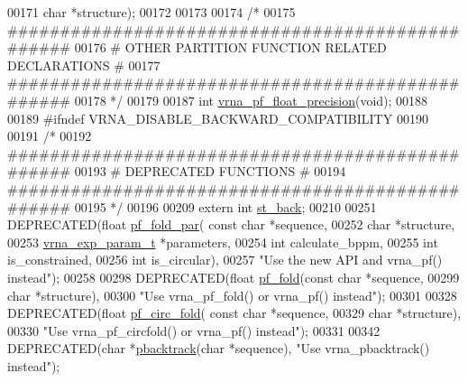 \begin{DoxyCode}
00171               \textcolor{keywordtype}{char}                  *structure);
00172 
00173 
00174 \textcolor{comment}{/*}
00175 \textcolor{comment}{#################################################}
00176 \textcolor{comment}{# OTHER PARTITION FUNCTION RELATED DECLARATIONS #}
00177 \textcolor{comment}{#################################################}
00178 \textcolor{comment}{*/}
00179 
00187 \textcolor{keywordtype}{int} \hyperlink{part__func_8h_ad2b3594f0b50b68029e0f54fdce59313}{vrna\_pf\_float\_precision}(\textcolor{keywordtype}{void});
00188 
00189 \textcolor{preprocessor}{#ifndef VRNA\_DISABLE\_BACKWARD\_COMPATIBILITY}
00190 
00191 \textcolor{comment}{/*}
00192 \textcolor{comment}{#################################################}
00193 \textcolor{comment}{# DEPRECATED FUNCTIONS                          #}
00194 \textcolor{comment}{#################################################}
00195 \textcolor{comment}{*/}
00196 
00209 \textcolor{keyword}{extern}  \textcolor{keywordtype}{int} \hyperlink{group__subopt__stochbt_gacd79b1a570e6ad9be24cb11fe8cae30a}{st\_back};
00210 
00251 DEPRECATED(\textcolor{keywordtype}{float}   \hyperlink{group__pf__fold_gac4f95bee734b2563a3d6e9932117ebdf}{pf\_fold\_par}(  \textcolor{keyword}{const} \textcolor{keywordtype}{char} *sequence,
00252                       \textcolor{keywordtype}{char} *structure,
00253                       \hyperlink{group__energy__parameters_structvrna__exp__param__s}{vrna\_exp\_param\_t} *parameters,
00254                       \textcolor{keywordtype}{int} calculate\_bppm,
00255                       \textcolor{keywordtype}{int} is\_constrained,
00256                       \textcolor{keywordtype}{int} is\_circular),
00257 \textcolor{stringliteral}{"Use the new API and vrna\_pf() instead"});
00258 
00298 DEPRECATED(\textcolor{keywordtype}{float}   \hyperlink{group__pf__fold_gadc3db3d98742427e7001a7fd36ef28c2}{pf\_fold}(\textcolor{keyword}{const} \textcolor{keywordtype}{char} *sequence,
00299                 \textcolor{keywordtype}{char} *structure),
00300 \textcolor{stringliteral}{"Use vrna\_pf\_fold() or vrna\_pf() instead"});
00301 
00328 DEPRECATED(\textcolor{keywordtype}{float}   \hyperlink{group__pf__fold_ga819ce5fca8984004ac81c4a3b04cb735}{pf\_circ\_fold}( \textcolor{keyword}{const} \textcolor{keywordtype}{char} *sequence,
00329                       \textcolor{keywordtype}{char} *structure),
00330 \textcolor{stringliteral}{"Use vrna\_pf\_circfold() or vrna\_pf() instead"});
00331 
00342 DEPRECATED(\textcolor{keywordtype}{char}    *\hyperlink{group__subopt__stochbt_gac03ca6db186bb3bf0a2a326d7fb3ba03}{pbacktrack}(\textcolor{keywordtype}{char} *sequence), \textcolor{stringliteral}{"Use vrna\_pbacktrack() instead"});

\end{DoxyCode}
